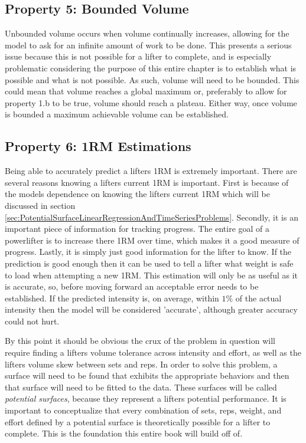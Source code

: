 \subsection{Property 5: Bounded Volume}
\label{sec:PotentialSurfaceIntuitiveRelationshipsBetweenVariablesBoundedVolume}

Unbounded volume occurs when volume continually increases, allowing for the model to ask for an infinite amount of work to be done. This presents a serious issue because this is not possible for a lifter to complete, and is especially problematic considering the purpose of this entire chapter is to establish what is possible and what is not possible. As such, volume will need to be bounded. This could mean that volume reaches a global maximum or, preferably to allow for property 1.b to be true, volume should reach a plateau. Either way, once volume is bounded a maximum achievable volume can be established.

\subsection{Property 6: 1RM Estimations}
\label{sec:PotentialSurfaceIntuitiveRelationshipsBetweenVariables1RMEstimations}

Being able to accurately predict a lifters 1RM is extremely important. There are several reasons knowing a lifters current 1RM is important. First is because of the models dependence on knowing the lifters current 1RM which will be discussed in section \ref{sec:PotentialSurfaceLinearRegressionAndTimeSeriesProblems}. Secondly, it is an important piece of information for tracking progress. The entire goal of a powerlifter is to increase there 1RM over time, which makes it a good measure of progress. Lastly, it is simply just good information for the lifter to know. If the prediction is good enough then it can be used to tell a lifter what weight is safe to load when attempting a new 1RM. This estimation will only be as useful as it is accurate, so, before moving forward an acceptable error needs to be established. If the predicted intensity is, on average, within $1\%$ of the actual intensity then the model will be considered 'accurate', although greater accuracy could not hurt.

By this point it should be obvious the crux of the problem in question will require finding a lifters volume tolerance across intensity and effort, as well as the lifters volume skew between sets and reps. In order to solve this problem, a surface will need to be found that exhibits the appropriate behaviors and then that surface will need to be fitted to the data. These surfaces will be called \textit{potential surfaces}, because they represent a lifters potential performance. It is important to conceptualize that every combination of sets, reps, weight, and effort defined by a potential surface is theoretically possible for a lifter to complete. This is the foundation this entire book will build off of.


